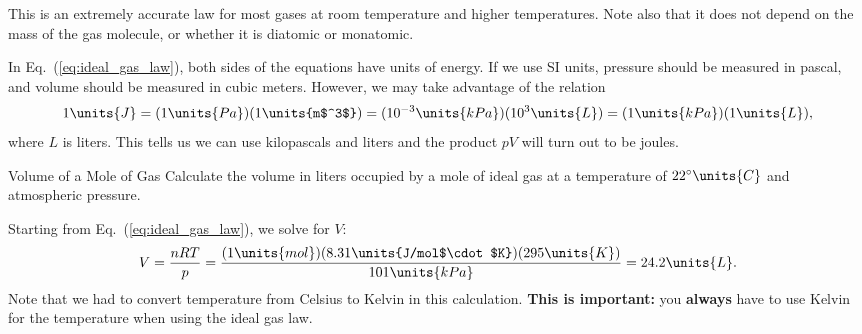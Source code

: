 This is an extremely accurate law for most gases at room temperature and
higher temperatures.  Note also that it does not depend on the mass of
the gas molecule, or whether it is diatomic or monatomic.

In Eq.~(\ref{eq:ideal_gas_law}), both sides of the equations have units
of energy.  If we use SI units, pressure should be measured in pascal,
and volume should be measured in cubic meters.   However, we may take
advantage of the relation
\begin{equation}
1\units{J} = (1\units{Pa})(1\units{m$^3$}) = 
(10^{-3}\units{kPa})(10^3\units{L}) = (1\units{kPa})(1\units{L}),
\end{equation}
where $L$ is liters.  This tells us we can use kilopascals and liters and
the product $pV$ will turn out to be joules.  

\begin{example}{Volume of a Mole of Gas}
  Calculate the volume in liters occupied by a mole of ideal gas at a
  temperature of $22^\circ\units{C}$ and atmospheric pressure.

  \solution Starting from Eq.~(\ref{eq:ideal_gas_law}), we solve for
  $V$:
  \begin{equation}
    V = \frac{nRT}{p} = \frac{(1\units{mol})(8.31\units{J/mol$\cdot$K})
      (295\units{K})}{101\units{kPa}} = 24.2\units{L}.
  \end{equation} 
  Note that we had to convert temperature from Celsius to Kelvin in
  this calculation.  {\bf This is important:} you {\bf always} have to
  use Kelvin for the temperature when using the ideal gas law.
\end{example}

